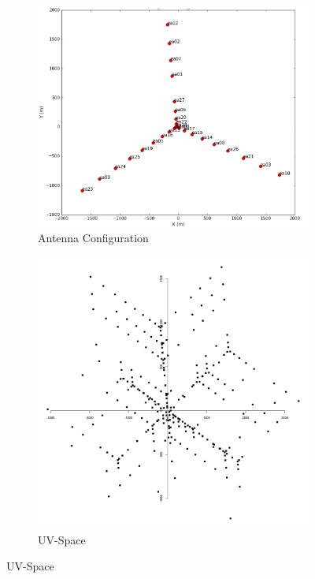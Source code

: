 \begin{figure}[h!]
	\centering
	\begin{subfigure}[b]{0.28\linewidth}
		\includegraphics[width=\linewidth, trim={18px 19px 18px 18px}, clip]{./chapters/01.intro/img/antennas.png}
		\caption{Antenna Configuration}
	\end{subfigure}
	\begin{subfigure}[b]{0.28\linewidth}
		\includegraphics[width=\linewidth, trim={18px 19px 18px 18px}, clip]{./chapters/01.intro/img/uv.png}
		\caption{UV-Space}
	\end{subfigure}


\end{figure}
